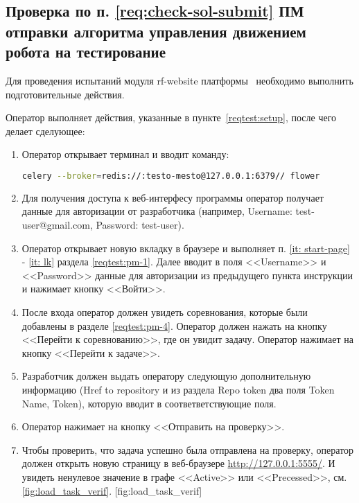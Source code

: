 \subsection{Проверка по п. \ref{req:check-sol-submit} ПМ отправки алгоритма управления движением робота на тестирование} \label{reqtest:pm-5}
Для проведения испытаний модуля rf-website платформы \productname\ необходимо выполнить подготовительные действия.

Оператор выполняет действия, указанные в пункте~\ref{reqtest:setup}, после чего делает сделующее:
\begin{enumerate}
    \item Оператор открывает терминал и вводит команду:
    \begin{lstlisting}[language=bash, numbers=none]
        celery --broker=redis://:testo-mesto@127.0.0.1:6379// flower
    \end{lstlisting}
    \item Для получения доступа к веб-интерфесу программы оператор получает данные для авторизации от разработчика (например, Username: test-user@gmail.com, Password: test-user).
    \item Оператор открывает новую вкладку в браузере и выполняет п. \ref{it: start-page} - \ref{it: lk} раздела \ref{reqtest:pm-1}. Далее вводит в поля <<Username>> и <<Password>> данные для авторизации из предыдущего пункта инструкции и нажимает кнопку <<Войти>>.
    \item После входа оператор должен увидеть соревнования, которые были добавлены в разделе \ref{reqtest:pm-4}. Оператор должен нажать на кнопку <<Перейти к соревнованию>>, где он увидит задачу. Оператор нажимает на кнопку <<Перейти к задаче>>.
    \item Разработчик должен выдать оператору следующую дополнительную информацию (Href to repository и из раздела Repo token два поля Token Name, Token), которую вводит в соответветствующие поля.
    \item Оператор нажимает на кнопку <<Отправить на проверку>>.
    \item Чтобы проверить, что задача успешно была отправлена на проверку, оператор должен открыть новую страницу в веб-браузере \url{http://127.0.0.1:5555/}. И увидеть ненулевое значение в графе <<Active>> или <<Precessed>>, см. \ref{fig:load_task_verif}.
    [fig:load_task_verif]
\end{enumerate}


\newpage

